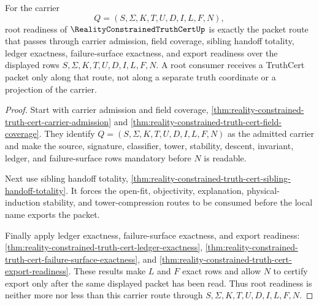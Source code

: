 \begin{theorem}
\label{thm:reality-constrained-truth-cert-root-readiness-packet}
For the carrier
$$
Q=(S,\Sigma,K,T,U,D,I,L,F,N),
$$
root readiness of $\RealityConstrainedTruthCertUp$ is exactly the packet route
that passes through carrier admission, field coverage, sibling handoff
totality, ledger exactness, failure-surface exactness, and export readiness
over the displayed rows $S,\Sigma,K,T,U,D,I,L,F,N$. A root consumer receives a
TruthCert packet only along that route, not along a separate truth coordinate
or a projection of the carrier.
\end{theorem}
\begin{proof}
Start with carrier admission and field coverage,
\autoref{thm:reality-constrained-truth-cert-carrier-admission} and
\autoref{thm:reality-constrained-truth-cert-field-coverage}. They identify
$Q=(S,\Sigma,K,T,U,D,I,L,F,N)$ as the admitted carrier and make the source,
signature, classifier, tower, stability, descent, invariant, ledger, and
failure-surface rows mandatory before $N$ is readable.

Next use sibling handoff totality,
\autoref{thm:reality-constrained-truth-cert-sibling-handoff-totality}. It
forces the open-fit, objectivity, explanation, physical-induction stability,
and tower-compression routes to be consumed before the local name exports the
packet.

Finally apply ledger exactness, failure-surface exactness, and export
readiness:
\autoref{thm:reality-constrained-truth-cert-ledger-exactness},
\autoref{thm:reality-constrained-truth-cert-failure-surface-exactness}, and
\autoref{thm:reality-constrained-truth-cert-export-readiness}. These results
make $L$ and $F$ exact rows and allow $N$ to certify export only after the same
displayed packet has been read. Thus root readiness is neither more nor less
than this carrier route through $S,\Sigma,K,T,U,D,I,L,F,N$.
\end{proof}

